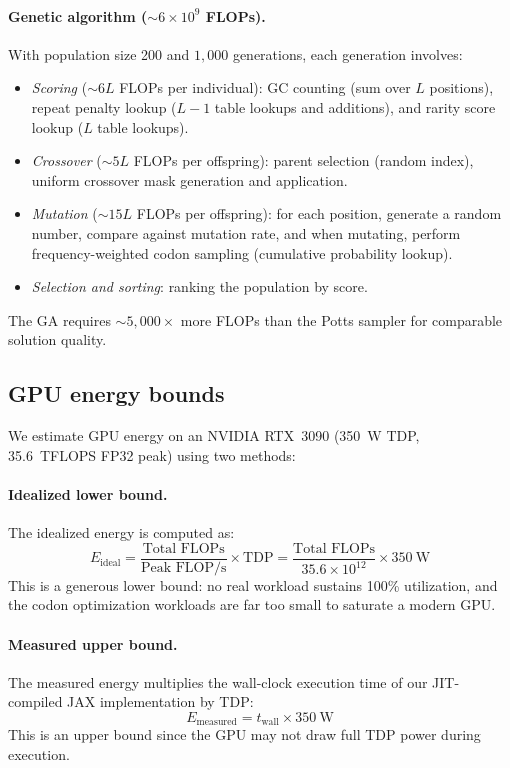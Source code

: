 \documentclass[11pt]{article}
\begin{document}
\paragraph{Genetic algorithm (${\sim}6 \times 10^9$ FLOPs).}
With population size 200 and $1{,}000$ generations, each generation involves:
\begin{itemize}
  \item \textit{Scoring} (${\sim}6L$ FLOPs per individual): GC counting (sum over $L$ positions), repeat penalty lookup ($L{-}1$ table lookups and additions), and rarity score lookup ($L$ table lookups).
  \item \textit{Crossover} (${\sim}5L$ FLOPs per offspring): parent selection (random index), uniform crossover mask generation and application.
  \item \textit{Mutation} (${\sim}15L$ FLOPs per offspring): for each position, generate a random number, compare against mutation rate, and when mutating, perform frequency-weighted codon sampling (cumulative probability lookup).
  \item \textit{Selection and sorting}: ranking the population by score.
\end{itemize}
The GA requires ${\sim}5{,}000\times$ more FLOPs than the Potts sampler for comparable solution quality.

\subsection*{GPU energy bounds}

We estimate GPU energy on an NVIDIA RTX~3090 (350~W TDP, 35.6~TFLOPS FP32 peak) using two methods:

\paragraph{Idealized lower bound.}
The idealized energy is computed as:
\begin{equation}
  E_{\mathrm{ideal}} = \frac{\text{Total FLOPs}}{\text{Peak FLOP/s}} \times \text{TDP}
  = \frac{\text{Total FLOPs}}{35.6 \times 10^{12}} \times 350~\text{W}
\end{equation}
This is a generous lower bound: no real workload sustains 100\% utilization, and the codon optimization workloads are far too small to saturate a modern GPU.

\paragraph{Measured upper bound.}
The measured energy multiplies the wall-clock execution time of our JIT-compiled JAX implementation by TDP:
\begin{equation}
  E_{\mathrm{measured}} = t_{\mathrm{wall}} \times 350~\text{W}
\end{equation}
This is an upper bound since the GPU may not draw full TDP power during execution.
\end{document}
